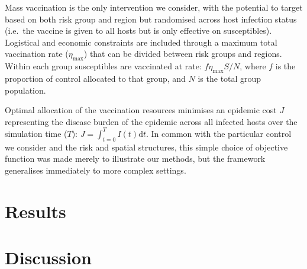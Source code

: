 Mass vaccination is the only intervention we consider, with the potential to target based on both risk group and region but randomised across host infection status (i.e.\ the vaccine is given to all hosts but is only effective on susceptibles). Logistical and economic constraints are included through a maximum total vaccination rate ($\eta_{\mathrm{max}}$) that can be divided between risk groups and regions. Within each group susceptibles are vaccinated at rate: $f\eta_{\mathrm{max}}S/N$, where $f$ is the proportion of control allocated to that group, and $N$ is the total group population.

Optimal allocation of the vaccination resources minimises an epidemic cost $J$ representing the disease burden of the epidemic across all infected hosts over the simulation time ($T$): $J = \int_{t=0}^TI(t)\mathrm{d}t$. In common with the particular control we consider and the risk and spatial structures, this simple choice of objective function was made merely to illustrate our methods, but the framework generalises immediately to more complex settings.

\section{Results}
\label{sec:ch4:Results}

\section{Discussion}
\label{sec:ch4:Discussion}
